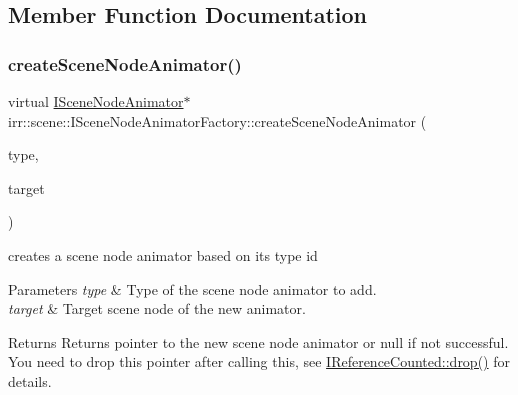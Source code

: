 \subsection{Member Function Documentation}
\mbox{\label{classirr_1_1scene_1_1ISceneNodeAnimatorFactory_a509845a16fa1fdd7241bb10416327eb2}} 
\subsubsection{\texorpdfstring{create\+Scene\+Node\+Animator()}{createSceneNodeAnimator()}\hspace{0.1cm}{\footnotesize\ttfamily [1/2]}}
{\footnotesize\ttfamily virtual \hyperlink{classirr_1_1scene_1_1ISceneNodeAnimator}{I\+Scene\+Node\+Animator}$\ast$ irr\+::scene\+::\+I\+Scene\+Node\+Animator\+Factory\+::create\+Scene\+Node\+Animator (\begin{DoxyParamCaption}\item[{\hyperlink{namespaceirr_1_1scene_a327a1e43872705cf8f3f3342fb307d19}{E\+S\+C\+E\+N\+E\+\_\+\+N\+O\+D\+E\+\_\+\+A\+N\+I\+M\+A\+T\+O\+R\+\_\+\+T\+Y\+PE}}]{type,  }\item[{\hyperlink{classirr_1_1scene_1_1ISceneNode}{I\+Scene\+Node} $\ast$}]{target }\end{DoxyParamCaption})\hspace{0.3cm}{\ttfamily [pure virtual]}}



creates a scene node animator based on its type id 


\begin{DoxyParams}{Parameters}
{\em type} & Type of the scene node animator to add. \\
\hline
{\em target} & Target scene node of the new animator. \\
\hline
\end{DoxyParams}
\begin{DoxyReturn}{Returns}
Returns pointer to the new scene node animator or null if not successful. You need to drop this pointer after calling this, see \hyperlink{classirr_1_1IReferenceCounted_a03856a09355b89d178090c4a5f738543}{I\+Reference\+Counted\+::drop()} for details. 
\end{DoxyReturn}
\mbox{\label{classirr_1_1scene_1_1ISceneNodeAnimatorFactory_a093f1fb03d8e1c73ff60c8612b0ba778}} 
